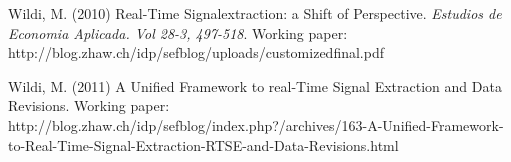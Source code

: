 \documentclass[11pt]{article}
\begin{document}
\begin{thebibliography}{99}
\bibitem{} Wildi, M. (2010) Real-Time Signalextraction: a Shift of Perspective. {\it Estudios de Economia Aplicada. Vol 28-3, 497-518}.
Working paper: http://blog.zhaw.ch/idp/sefblog/uploads/customized\textunderscore final.pdf


\bibitem{} Wildi, M. (2011)  A Unified Framework to real-Time Signal Extraction and Data Revisions.
Working paper: http://blog.zhaw.ch/idp/sefblog/index.php?/archives/163-A-Unified-Framework-to-Real-Time-Signal-Extraction-RTSE-and-Data-Revisions.html



\end{thebibliography}
%
\end{document}
